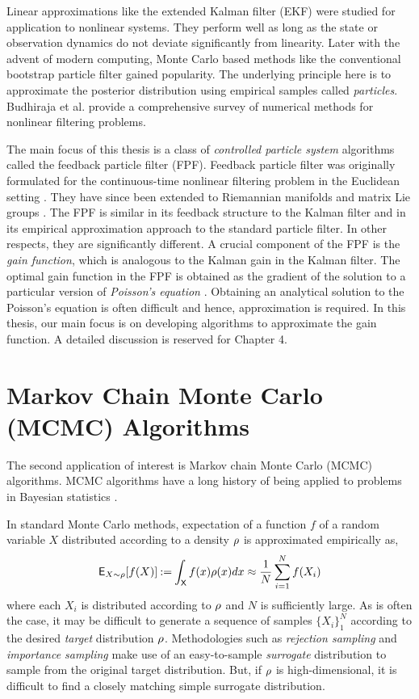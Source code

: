 Linear approximations like the extended Kalman filter (EKF) were studied for application to nonlinear systems. They perform well as long as the state or observation dynamics do not deviate significantly from linearity. Later with the advent of modern computing, Monte Carlo based methods like the conventional bootstrap particle filter gained popularity. The underlying principle here is to approximate the posterior distribution using empirical samples called \textit{particles}. Budhiraja et al. \cite{budchelee07} provide a comprehensive survey of numerical methods for nonlinear filtering problems. 

The main focus of this thesis is a class of \textit{controlled particle system} algorithms called the feedback particle filter (FPF). Feedback particle filter was originally formulated for the continuous-time nonlinear filtering problem in the Euclidean setting \cite{yanmehmey13}. They have since been extended to Riemannian manifolds and matrix Lie groups \cite{zhatagmeh16}. The FPF is similar in its feedback structure to the Kalman filter and in its empirical approximation approach to the standard particle filter. In other respects, they are significantly different. A crucial component of the FPF is the \textit{gain function}, which is analogous to the Kalman gain in the Kalman filter. The optimal gain function in the FPF is obtained as the gradient of the solution to a particular version of \textit{Poisson's equation} \cite{yanmehmey13, laumehmeyrag14}. Obtaining an analytical solution to the Poisson's equation is often difficult and hence, approximation is required. In this thesis, our main focus is on developing algorithms to approximate the gain function. A detailed discussion is reserved for Chapter 4. %

\section{Markov Chain Monte Carlo (MCMC) Algorithms}
The second application of interest is Markov chain Monte Carlo (MCMC) algorithms. MCMC algorithms have a long history of being applied to problems in Bayesian statistics \cite{}. 

In standard Monte Carlo methods, expectation of a function $f$ of a random variable $X$ distributed according to a density $\rho$ is approximated empirically as,
\begin{equation}
 {\sf E}_{X \sim \rho} [f(X)] \mathbin{:=} \int_{\sf X} f(x)\rho(x) dx \approx \frac{1}{N} \sum_{i=1}^N f(X_i) 
\end{equation}
where each $X_i$ is distributed according to $\rho$ and $N$ is sufficiently large. As is often the case, it may be difficult to generate a sequence of samples $\{X_i\}_1^N$ according to the desired \textit{target} distribution $\rho$. Methodologies such as \textit{rejection sampling} and \textit{importance sampling} make use of an easy-to-sample \textit{surrogate} distribution to sample from the original target distribution. But, if $\rho$ is high-dimensional, it is difficult to find a closely matching simple surrogate distribution. 


